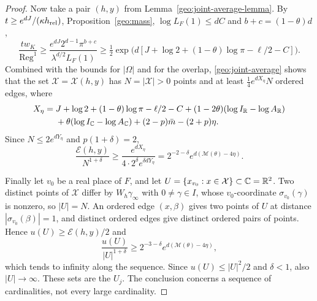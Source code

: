\begin{proof}
Now take a pair $(h,y)$ from Lemma~\ref{geo:joint-average-lemma}. By
$t\ge e^{dJ}/(\kappa h_{\rm rel})$, Proposition~\ref{geo:mass},
$\log L_F(1)\le dC$ and $b+c=(1-\theta)d$,
\[
 \frac{tw_K}{\operatorname{Reg}^1}\ge
 \frac{e^{dJ}2^{d-1}\pi^{b+c}}{\lambda^{d/2}L_F(1)}
 \ge\tfrac12\exp\bigl(d[J+\log2+(1-\theta)\log\pi-\ell/2-C]\bigr).
\]
Combined with the bounds for $|\Omega|$ and for the overlap,
\eqref{geo:joint-average} shows that the set
$\mathcal X=\mathcal X(h,y)$ has $N=|\mathcal X|>0$ points and at least
$\tfrac14e^{dX_\eta}N$ ordered edges, where
\[
 \begin{aligned}
 X_\eta={}&J+\log2+(1-\theta)\log\pi-\ell/2-C
 +(1-2\theta)(\log I_\mathbb R-\log A_\mathbb R)\\
 &+\theta(\log I_\mathbb C-\log A_\mathbb C)+(2-p)\bar m-(2+p)\eta.
 \end{aligned}
\]
Since $N\le2e^{dY_\eta}$ and $p(1+\delta)=2$,
\[
 \frac{\mathcal E(h,y)}{N^{1+\delta}}
 \ge\frac{e^{dX_\eta}}{4\cdot2^\delta e^{\delta dY_\eta}}
 =2^{-2-\delta}e^{d(\mathcal M(\theta)-4\eta)}.
\]

Finally let $v_0$ be a real place of $F$, and let
$U=\{x_{v_0}:x\in\mathcal X\}\subset\mathbb C=\mathbb R^2$. Two distinct points of
$\mathcal X$ differ by $W_h\gamma_\infty$ with $0\ne\gamma\in I$, whose
$v_0$-coordinate $\sigma_{v_0}(\gamma)$ is nonzero, so $|U|=N$. An
ordered edge $(x,\beta)$ gives two points of $U$ at distance
$|\sigma_{v_0}(\beta)|=1$, and distinct ordered edges give distinct
ordered pairs of points. Hence $u(U)\ge\mathcal E(h,y)/2$ and
\[
 \frac{u(U)}{|U|^{1+\delta}}
 \ge2^{-3-\delta}e^{d(\mathcal M(\theta)-4\eta)},
\]
which tends to infinity along the sequence. Since $u(U)\le|U|^2/2$ and
$\delta<1$, also $|U|\to\infty$. These sets are the $U_j$. The
conclusion concerns a sequence of cardinalities, not every large
cardinality.
\end{proof}
